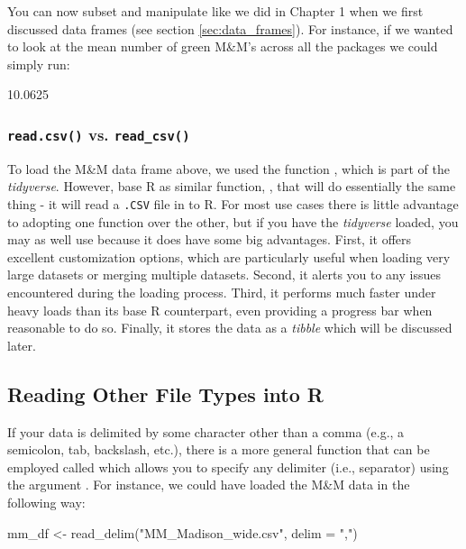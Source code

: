 You can now subset and manipulate  like we did in Chapter 1 when we first discussed data frames (see section \ref{sec:data_frames}). For instance, if we wanted to look at the mean number of green M\&M's across all the packages we could simply run:

\begin{outR}
[1] 10.0625
\end{outR}

\subsubsection{\texttt{read.csv()} vs. \texttt{read\_csv()}}

To load the M\&M data frame above, we used the function , which is part of the \textit{tidyverse}. However, base R as similar function, , that will do essentially the same thing - it will read a \texttt{.CSV} file in to R. For most use cases there is little advantage to adopting one function over the other, but if you have the \textit{tidyverse} loaded, you may as well use  because it does have some big advantages. First, it offers excellent customization options, which are particularly useful when loading very large datasets or merging multiple datasets. Second, it alerts you to any issues encountered during the loading process. Third, it performs much faster under heavy loads than its base R counterpart, even providing a progress bar when reasonable to do so. Finally, it stores the data as a \textit{tibble} which will be discussed later.

\subsection{Reading Other File Types into R}

If your data is delimited by some character other than a comma (e.g., a semicolon, tab, backslash, etc.), there is a more general function that can be employed called  which allows you to specify any delimiter (i.e., separator) using the argument . For instance, we could have loaded the M\&M data in the following way:

\begin{inR}
mm_df <- read_delim("MM_Madison_wide.csv", delim = ",")
\end{inR}

